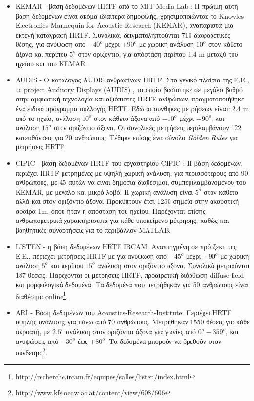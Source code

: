 \begin{itemize}
   \item KEMAR - βάση δεδομένων HRTF από το MIT-Media-Lab \cite{Gardner1995}: Η πρώιμη αυτή βάση δεδομένων είναι ακόμα ιδιαίτερα δημοφιλής, χρησιμοποιώντας το Knowles-Electronics Mannequin for Acoustic Research (KEMAR), αναπαριστά μια εκτενή καταγραφή HRTF. Συνολικά, δειγματοληπτούνται 710 διαφορετικές θέσης, για ανύψωση από $-40^o$ μέχρι $+90^o$ με χωρική ανάλυση $10^o$ στον κάθετο άξονα και περίπου $5^o$ στον οριζόντιο, για απόσταση περίπου 1.4 m μεταξύ του ηχείου και του KEMAR.
   
   \item AUDIS - Ο κατάλογος AUDIS ανθρωπίνων HRTF: Στο γενικό πλαίσιο της Ε.Ε., το project Auditory Displays (AUDIS) \cite{Blauert_1998}, το οποίο βασίστηκε σε μεγάλο βαθμό στην αμφιωτική τεχνολογία και αξιόπιστες HRTF ανθρώπων, πραγματοποιήθηκε ένα ειδικό πρόγραμμα συλλογής HRTF. Εδώ οι συνθήκες μετρήσεων είναι: 2.4 m από το ηχείο, ανάλυση $10^o$ στον κάθετο άξονα από $-10^o$ μέχρι $+90^o$, και ανάλυση $15^o$ στον οριζόντιο άξονα. Οι συνολικές μετρήσεις περιλαμβάνουν 122 κατευθύνσεις για 20 ανθρώπους. Τέθηκε επίσης ένα σύνολο \textit{Golden Rules} για μετρήσεις HRTF.
   
   \item CIPIC - βάση δεδομένων HRTF του εργαστηρίου CIPIC \cite{AlgaziOct.21242001}: Η βάση δεδομένων, περιέχει HRTF μετρημένες με υψηλή χωρική ανάλυση, για περισσότερους από 90 ανθρώπους, με 45 αυτών να είναι δημόσια διαθέσιμοι, συμπεριλαμβανομένου του KEMAR, με μεγάλο και μικρό λοβό. Η χωρική ανάλυση είναι $5^o$ στον κάθετο αλλά και στον οριζόντιο άξονα. Προκύπτουν έτσι 1250 σημεία στην ακουστική σφαίρα 1m, όπου ήταν η απόσταση του ηχείου. Παρέχονται επίσης ανθρωπομετρικά χαρακτηριστικά για κάθε υποκείμενο μέτρησης, καθώς και βοηθητικές συναρτήσεις για το περιβάλλον MATLAB.
   
   \item LISTEN - η βάση δεδομένων HRTF IRCAM: Αναπτηγμένη σε πρότζεκτ της Ε.Ε., περιέχει μετρήσεις HRTF με για  ανύψωση από $-45^o$ μέχρι $+90^o$ με χωρική ανάλυση $5^o$ και περίπου $15^o$ ανάλυση στον οριζόντιο άξονα. Συνολικά μετριούνται 187 θέσεις. Παρέχονται οι μετρήσεις HRTF, προαιρετική διόρθωση diffuse-field και μορφολογικά δεδομένα. Τα δεδομένα που μετρήθηκαν για 50 ανθρώπους είναι διαθέσιμα online\footnote{http://recherche.ircam.fr/equipes/salles/listen/index.html}.
   
   \item ARI - Βάση δεδομένων του Acoustics-Research-Institute: Περιέχει HRTF υψηλής ανάλυσης για πάνω από 70 ανθρώπους. Μετρήθηκαν 1550 θέσεις για κάθε ακροατή, με $2.5^o$ ανάλυση στον οριζόντιο άξονα για γωνίες από $0^o - 359^o$, και ανυψώσεις από $-30^o$ έως $+80^o$. Τα δεδομένα μπορούν να βρεθούν στον σύνδεσμο\footnote{http://www.kfs.oeaw.ac.at/content/view/608/606}.
   

\end{itemize}
